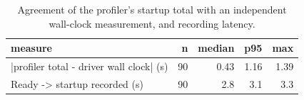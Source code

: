 \begin{table}[t]
\centering\small
\caption{Agreement of the profiler's startup total with an independent wall-clock measurement, and recording latency.}\label{tab:rq1_agreement}
\begin{tabular}{lrrrr}
\toprule
measure & n & median & p95 & max \\
\midrule
|profiler total - driver wall clock| (s) & 90 & 0.43 & 1.16 & 1.39 \\
Ready -> startup recorded (s) & 90 & 2.8 & 3.1 & 3.3 \\
\bottomrule
\end{tabular}
\end{table}
